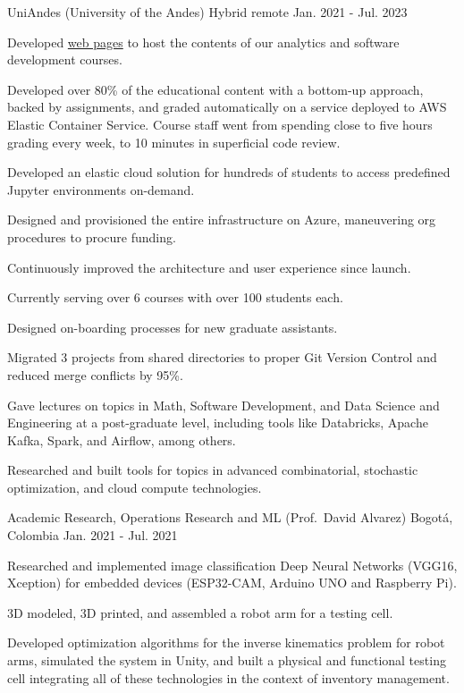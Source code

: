 \begin{cventries}
	{UniAndes (University of the Andes)} %
	{Hybrid remote} %
	{Jan. 2021 {-} Jul. 2023} %
	{
		\begin{cvitems} %
			\item {Developed \href{https://copa-uniandes.github.io/PAD-web-tutorials/intro.html}{web pages} to host the contents of our analytics and software development courses.}
			\item {Developed over 80\% of the educational content with a bottom-up approach, backed by assignments, and graded automatically on a service deployed to AWS Elastic Container Service. Course staff went from spending close to five hours grading every week, to 10 minutes in superficial code review.}
			\item {Developed an elastic cloud solution for hundreds of students to access predefined Jupyter environments on-demand.}
			\item {Designed and provisioned the entire infrastructure on Azure, maneuvering org procedures to procure funding.}
			\item {Continuously improved the architecture and user experience since launch.}
			\item {Currently serving over 6 courses with over 100 students each.}
			\item {Designed on-boarding processes for new graduate assistants.}
			\item {Migrated 3 projects from shared directories to proper Git Version Control and reduced merge conflicts by 95\%.}
			\item {Gave lectures on topics in Math, Software Development, and Data Science and Engineering at a post-graduate level, including tools like Databricks, Apache Kafka, Spark, and Airflow, among others.}
			\item {Researched and built tools for topics in advanced combinatorial, stochastic optimization, and cloud compute technologies.}
		\end{cvitems}
	}

	{Academic Research, Operations Research and ML (Prof.\ David Alvarez)} %
	{Bogotá, Colombia} %
	{Jan. 2021 {-} Jul. 2021} %
	{
		\begin{cvitems} %
			\item {Researched and implemented image classification Deep Neural Networks (VGG16, Xception) for embedded devices (ESP32-CAM, Arduino UNO and Raspberry Pi).}
			\item {3D modeled, 3D printed, and assembled a robot arm for a testing cell.}
			\item {Developed optimization algorithms for the inverse kinematics problem for robot arms, simulated the system in Unity, and built a physical and functional testing cell integrating all of these technologies in the context of inventory management.}
		\end{cvitems}
	}


\end{cventries}
